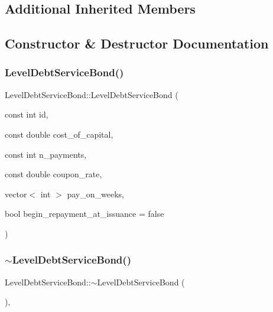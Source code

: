 \subsection*{Additional Inherited Members}


\subsection{Constructor \& Destructor Documentation}
\mbox{\label{classLevelDebtServiceBond_a71af87d057090bd2310a10df03b36fdf}} 
\subsubsection{\texorpdfstring{Level\+Debt\+Service\+Bond()}{LevelDebtServiceBond()}}
{\footnotesize\ttfamily Level\+Debt\+Service\+Bond\+::\+Level\+Debt\+Service\+Bond (\begin{DoxyParamCaption}\item[{const int}]{id,  }\item[{const double}]{cost\+\_\+of\+\_\+capital,  }\item[{const int}]{n\+\_\+payments,  }\item[{const double}]{coupon\+\_\+rate,  }\item[{vector$<$ int $>$}]{pay\+\_\+on\+\_\+weeks,  }\item[{bool}]{begin\+\_\+repayment\+\_\+at\+\_\+issuance = {\ttfamily false} }\end{DoxyParamCaption})}

\mbox{\label{classLevelDebtServiceBond_a6327829c1f1e6941cc22cea371cf024a}} 
\subsubsection{\texorpdfstring{$\sim$\+Level\+Debt\+Service\+Bond()}{~LevelDebtServiceBond()}}
{\footnotesize\ttfamily Level\+Debt\+Service\+Bond\+::$\sim$\+Level\+Debt\+Service\+Bond (\begin{DoxyParamCaption}{ }\end{DoxyParamCaption})\hspace{0.3cm}{\ttfamily [override]}, {\ttfamily [default]}}



